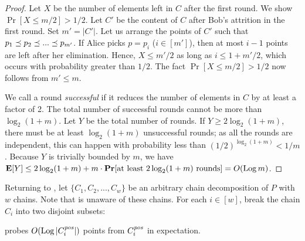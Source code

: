 \begin{proof}
    Let $X$ be the number of elements left in $C$ after the first round. We show $\Pr[X \le m/2] > 1/2$. Let $C'$ be the content of $C$ after Bob's attrition in the first round. Set $m' = |C'|$. Let us arrange the points of $C'$ such that $p_1 \preceq p_2 \preceq  ... \preceq p_{m'}$. If Alice picks $p = p_i$ ($i \in [m']$), then at most $i - 1$ points are left after her elimination. Hence, $X \le m'/2$ as long as $i \le 1 + m'/2$, which occurs with probability greater than $1/2$. The fact $\Pr[X \le m/2] > 1/2$ now follows from $m' \le m$.

    \vgap

    We call a round {\em successful} if it reduces the number of elements in $C$ by at least a factor of 2. The total number of successful rounds cannot be more than $\log_2 (1+m)$. Let $Y$ be the total number of rounds. If $Y \ge 2 \log_2 (1+m)$, there must be at least $\log_2 (1+m)$ unsuccessful rounds; as all the rounds are independent, this can happen with probability less than $(1/2)^{\log_2 (1+m)} < 1/m$. Because $Y$ is trivially bounded by $m$, we have $\operatorname*{\mathbf{E}}[Y] \le 2 \log_2 (1+m) + m \cdot \mathbf{Pr}[\text{at least $2 \log_2 (1+m)$ rounds}] = O(\operatorname*{Log} m)$.
\end{proof}

 Returning to , let $\{C_1, C_2, ..., C_w\}$ be an arbitrary chain decomposition of $P$ with $w$ chains. Note that  is unaware of these chains. For each $i \in [w]$, break the chain $C_i$ into two disjoint subsets:

\begin{lemma} \label{lmm:rpe:cost-one-chain}
     probes $O(\operatorname*{Log} |C^\mathit{pos}_i|)$ points from $C^\mathit{pos}_i$ in expectation.
\end{lemma}


